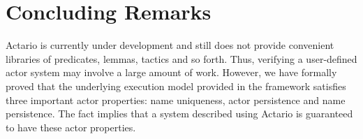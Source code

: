 \section{Concluding Remarks}
\label{sec:conclusion}

Actario is currently under development and still does not provide
convenient libraries of predicates, lemmas, tactics and so
forth. Thus, verifying a user-defined actor system may involve a large
amount of work. However, we have formally proved that the underlying
execution model provided in the framework satisfies three important
actor properties: name uniqueness, actor persistence and name
persistence. The fact implies that a system described using Actario is
guaranteed to have these actor properties.
